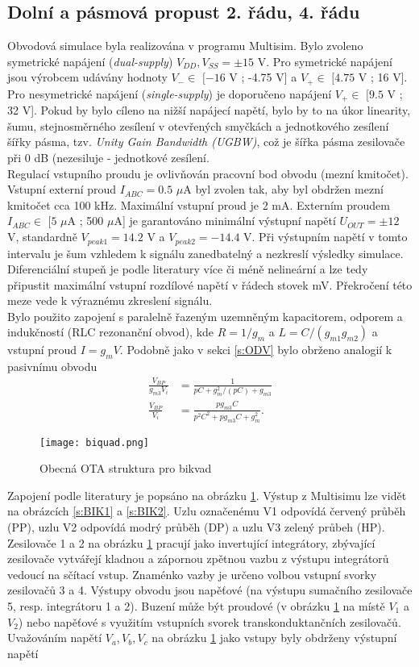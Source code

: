 \subsection{Dolní a pásmová propust 2. řádu, 4. řádu}\label{s:DP2}
\noindent Obvodová simulace byla realizována v programu Multisim. Bylo zvoleno symetrické napájení (\textit{dual-supply}) $V_{DD},V_{SS} = \pm 15$ V. Pro symetrické napájení jsou výrobcem udávány hodnoty $V_{-} \in$ $[-16$ V ; -4.75 V] a $V_{+} \in$ $[4.75$ V ; 16 V]. Pro nesymetrické napájení (\textit{single-supply}) je doporučeno napájení $V_{+} \in$ $[9.5$ V ; 32 V]. Pokud by bylo cíleno na nižší napájecí napětí, bylo by to na úkor linearity, šumu, stejnosměrného zesílení v otevřených smyčkách a jednotkového zesílení šířky pásma, tzv. \textit{Unity Gain Bandwidth (UGBW)}, což je šířka pásma zesilovače při 0 dB (nezesiluje - jednotkové zesílení.\\
Regulací vstupního proudu je ovlivňován pracovní bod obvodu (mezní kmitočet). Vstupní externí proud $I_{ABC} = 0.5$ $\mu$A byl zvolen tak, aby byl obdržen mezní kmitočet cca 100 kHz. Maximální vstupní proud je 2 mA. Externím proudem $I_{ABC} \in$ $[5$ $\mu$A ; 500 $\mu$A] je garantováno minimální výstupní napětí $U_{OUT} = \pm 12$ V, standardně $V_{peak 1} = 14.2$ V a $V_{peak 2} = -14.4$ V. Při výstupním napětí v tomto intervalu je šum vzhledem k signálu zanedbatelný a nezkreslí výsledky simulace.\\
\noindent Diferenciální stupeň je podle literatury \cite{8} více či méně nelineární a lze tedy připustit maximální vstupní rozdílové napětí v řádech stovek mV. Překročení této meze vede k výraznému zkreslení signálu.\\
\noindent Bylo použito zapojení s paralelně řazeným uzemněným kapacitorem, odporem a indukčností (RLC rezonanční obvod), kde $R = 1/g_m$ a $L = C/(g_{m1}g_{m2})$ a vstupní proud $I = g_mV$. Podobně jako v sekci \ref{s:ODV} bylo obrženo analogií k pasivnímu obvodu
\begin{align}
\frac{V_{BP}}{g_{m3}V_i} &= \frac{1}{pC + g_m^2/(pC) + g_{m3}}\\
\frac{V_{BP}}{V_i} &= \frac{pg_{m3}C}{p^2C^2 + pg_{m3}C + g_m^2}.
\end{align}
\begin{figure}[h]
\centering
\texttt{[image: biquad.png]}
\caption[Obecná OTA struktura pro bikvad]{Obecná OTA struktura pro bikvad \cite{18} \label{s:BIK}}
\end{figure}
\noindent Zapojení podle literatury \cite{18} je popsáno na obrázku \ref{s:BIK}. Výstup z Multisimu lze vidět na obrázcích \ref{s:BIK1} a \ref{s:BIK2}. Uzlu označenému V1 odpovídá červený průběh (PP), uzlu V2 odpovídá modrý průběh (DP) a uzlu V3 zelený průbeh (HP). Zesilovače 1 a 2 na obrázku \ref{s:BIK} pracují jako invertující integrátory, zbývající zesilovače vytvářejí kladnou a zápornou zpětnou vazbu z výstupu integrátorů vedoucí na sčítací vstup. Znaménko vazby je určeno volbou vstupní svorky zesilovačů 3 a 4. Výstupy obvodu jsou napěťové (na výstupu sumačního zesilovače 5, resp. integrátoru 1 a 2). Buzení může být proudové (v obrázku \ref{s:BIK} na místě $V_1$ a $V_2$) nebo napěťové s využitím vstupních svorek transkonduktančních zesilovačů. Uvažováním napětí $V_a, V_b, V_c$ na obrázku \ref{s:BIK} jako vstupy byly obdrženy výstupní napětí
